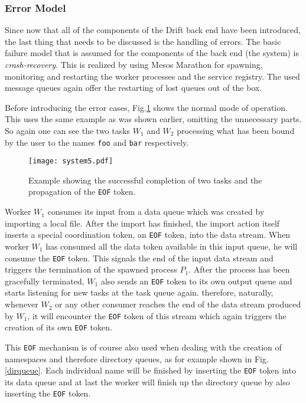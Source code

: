 \subsubsection{Error Model}
\label{errormodel}

Since now that all of the components of the Drift back end have
been introduced, the last thing that needs to be discussed is
the handling of errors. The basic failure model that is assumed
for the components of the back end (the system) is
\textit{crash-recovery}. This is realized by using Mesos Marathon
for spawning, monitoring and restarting the worker processes and
the service registry. The used message queues again offer the
restarting of lost queues out of the box.

Before introducing the error cases, Fig.\ref{system5} shows
the normal mode of operation. This uses the same example as
was shown earlier, omitting the unnecessary parts. So again
one can see the two tasks $W_{1}$ and $W_{2}$ processing
what has been bound by the user to the names \texttt{foo} and
\texttt{bar} respectively.

\begin{figure}[h]
  \texttt{[image: system5.pdf]}
  \caption{Example showing the successful completion of two
           tasks and the propagation of the \texttt{EOF} token.}
  \label{system5}
\end{figure}

Worker $W_{1}$ consumes its input from a data queue which was
created by importing a local file. After the import has finished,
the import action itself inserts a special coordination token,
an \texttt{EOF} token, into the data stream. When worker
$W_{1}$ has consumed all the data token available in this
input queue, he will consume the \texttt{EOF} token. This
signals the end of the input data stream and triggers the
termination of the spawned process $P_{1}$. After the process has
been gracefully terminated, $W_{1}$ also sends an \texttt{EOF}
token to its own output queue and starts listening for new
tasks at the task queue again. therefore, naturally, whenever
$W_{2}$ or any other consumer reaches the end of the data
stream produced by $W_{1}$, it will encounter the \texttt{EOF}
token of this stream which again triggers the creation
of its own \texttt{EOF} token.

This \texttt{EOF} mechanism is of course also used when
dealing with the creation of namespaces and therefore
directory queues, as for example shown in Fig.\ref{dirqueue}.
Each individual name will be finished by inserting the \texttt{EOF}
token into its data queue and at last the worker will finish
up the directory queue by also inserting the \texttt{EOF} token.
\newline

